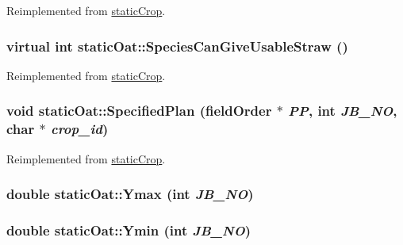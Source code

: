 Reimplemented from \hyperlink{classstatic_crop_ada7c8c797de629277a5ba0b0a4a3c17e}{staticCrop}.\hypertarget{classstatic_oat_ab66ee7686d5a79a84ad38d01652910ac}{
\subsubsection[{SpeciesCanGiveUsableStraw}]{\setlength{\rightskip}{0pt plus 5cm}virtual int staticOat::SpeciesCanGiveUsableStraw ()}}
\label{classstatic_oat_ab66ee7686d5a79a84ad38d01652910ac}


Reimplemented from \hyperlink{classstatic_crop_ab7763e4e6a0b9eff1788cb86ebad8170}{staticCrop}.\hypertarget{classstatic_oat_a9d47d1105b60fba4f7c96764bf6229d2}{
\subsubsection[{SpecifiedPlan}]{\setlength{\rightskip}{0pt plus 5cm}void staticOat::SpecifiedPlan ({\bf fieldOrder} $\ast$ {\em PP}, \/  int {\em JB\_\-NO}, \/  char $\ast$ {\em crop\_\-id})}}
\label{classstatic_oat_a9d47d1105b60fba4f7c96764bf6229d2}


Reimplemented from \hyperlink{classstatic_crop_af19d8a1e4f4833325f6712c22ede8b45}{staticCrop}.\hypertarget{classstatic_oat_afcb9f339277f591080a6b5b250072ddf}{
\subsubsection[{Ymax}]{\setlength{\rightskip}{0pt plus 5cm}double staticOat::Ymax (int {\em JB\_\-NO})}}
\label{classstatic_oat_afcb9f339277f591080a6b5b250072ddf}
\hypertarget{classstatic_oat_aff0b5a68a133cbd31864cab9cb6df147}{
\subsubsection[{Ymin}]{\setlength{\rightskip}{0pt plus 5cm}double staticOat::Ymin (int {\em JB\_\-NO})}}
\label{classstatic_oat_aff0b5a68a133cbd31864cab9cb6df147}



